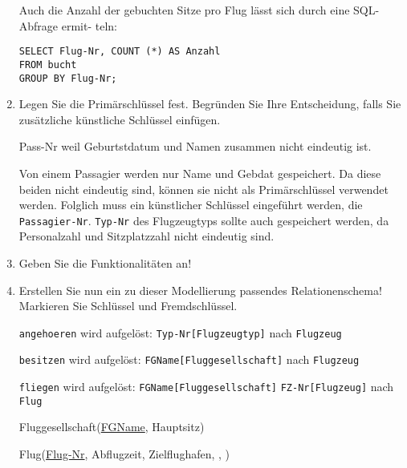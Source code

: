 \documentclass{lehramt-informatik}
\begin{document}
\begin{enumerate}
\begin{antwort}
Auch die Anzahl der gebuchten Sitze pro Flug lässt sich durch eine
SQL-Abfrage ermit- teln:

\begin{verbatim}
SELECT Flug-Nr, COUNT (*) AS Anzahl
FROM bucht
GROUP BY Flug-Nr;
\end{verbatim}
\end{antwort}


\item Legen Sie die Primärschlüssel fest. Begründen Sie Ihre
Entscheidung, falls Sie zusätzliche künstliche Schlüssel einfügen.

\begin{antwort}[richtig]
Pass-Nr weil Geburtstdatum und Namen zusammen nicht
eindeutig ist.
\end{antwort}

\begin{antwort}[muster]
Von einem Passagier werden nur Name und Gebdat gespeichert. Da
diese beiden nicht eindeutig sind, können sie nicht als Primärschlüssel
verwendet werden. Folglich muss ein künstlicher Schlüssel eingeführt
werden, die \verb|Passagier-Nr|. \verb|Typ-Nr| des Flugzeugtyps sollte
auch gespeichert werden, da Personalzahl und Sitzplatzzahl nicht
eindeutig sind.
\end{antwort}


\item Geben Sie die Funktionalitäten an!


\item Erstellen Sie nun ein zu dieser Modellierung passendes
Relationenschema! Markieren Sie Schlüssel und Fremdschlüssel.

\begin{antwort}[richtig]
\verb|angehoeren| wird aufgelöst: \verb|Typ-Nr[Flugzeugtyp]| nach
\verb|Flugzeug|

\verb|besitzen| wird aufgelöst: \verb|FGName[Fluggesellschaft]| nach
\verb|Flugzeug|

\verb|fliegen| wird aufgelöst: \verb|FGName[Fluggesellschaft]|
\verb|FZ-Nr[Flugzeug]| nach \verb|Flug|

\bigskip

{
\footnotesize\ttfamily
Fluggesellschaft(\underline{FGName}, Hauptsitz)

Flug(\underline{Flug-Nr}, Abflugzeit, Zielflughafen,
,
)

}
\end{antwort}
\end{enumerate}
\end{document}
